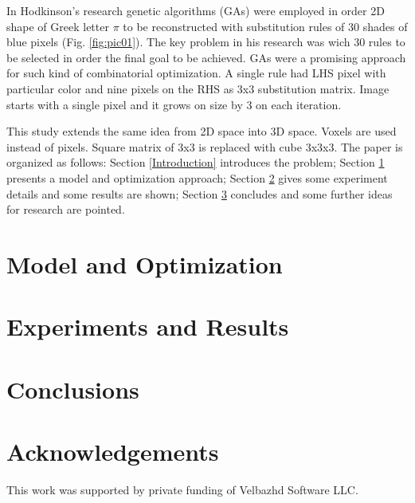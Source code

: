\documentclass{llncs}
\begin{document}
In Hodkinson's research genetic algorithms (GAs) were employed in order 2D shape of Greek letter $\pi$ to be reconstructed with substitution rules of 30 shades of blue pixels (Fig. \ref{fig:pic01}). The key problem in his research was wich 30 rules to be selected in order the final goal to be achieved. GAs were a promising approach for such kind of combinatorial optimization. A single rule had LHS pixel with particular color and nine pixels on the RHS as 3x3 substitution matrix. Image starts with a single pixel and it grows on size by 3 on each iteration. 

This study extends the same idea from 2D space into 3D space. Voxels are used instead of pixels. Square matrix of 3x3 is replaced with cube 3x3x3. The paper is organized as follows: Section \ref{Introduction} introduces the problem; Section \ref{Model and Optimization} presents a model and optimization approach; Section \ref{Experiments and Results} gives some experiment details and some results are shown; Section \ref{Conclusions} concludes and some further ideas for research are pointed.

\section{Model and Optimization} \label{Model and Optimization}

\section{Experiments and Results} \label{Experiments and Results}

\section{Conclusions} \label{Conclusions}

\section*{Acknowledgements}
This work was supported by private funding of Velbazhd Software LLC.

\begin{thebibliography}{99}
\end{thebibliography}
\end{document}
